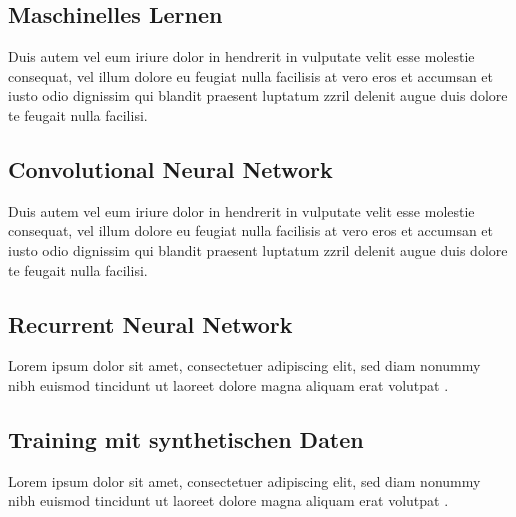 \subsection{Maschinelles Lernen}
\label{grundlagen_nn_ml}

Duis autem vel eum iriure dolor in hendrerit in vulputate velit esse molestie consequat, vel illum dolore eu feugiat nulla facilisis at vero eros et accumsan et iusto odio dignissim qui blandit praesent luptatum zzril delenit augue duis dolore te feugait nulla facilisi. 


\subsection{Convolutional Neural Network}
\label{grundlagen_nn_cnn}

Duis autem vel eum iriure dolor in hendrerit in vulputate velit esse molestie consequat, vel illum dolore eu feugiat nulla facilisis at vero eros et accumsan et iusto odio dignissim qui blandit praesent luptatum zzril delenit augue duis dolore te feugait nulla facilisi. 


\subsection{Recurrent Neural Network}
\label{grundlagen_nn_rnn}

Lorem ipsum dolor sit amet, consectetuer adipiscing elit, sed diam nonummy nibh euismod tincidunt ut laoreet dolore magna aliquam erat volutpat \cite{latexcompanion}. 


\subsection{Training mit synthetischen Daten}
\label{grundlagen_nn_synthetisch}

Lorem ipsum dolor sit amet, consectetuer adipiscing elit, sed diam nonummy nibh euismod tincidunt ut laoreet dolore magna aliquam erat volutpat \cite{latexcompanion}. 


